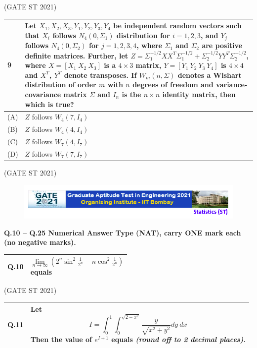 \documentclass[journal,12pt,onecolumn]{IEEEtran}
\theoremstyle{remark}
\begin{document}
\bigskip
\hfill (GATE ST 2021)
\\

\begin{tabular}{|p{1cm}|p{12.5cm}|}
\hline
\textbf{}9 & 
Let $X_1, X_2, X_3, Y_1, Y_2, Y_3, Y_4$ be independent random vectors such that $X_i$ follows $N_4(0, \Sigma_1)$ distribution for $i=1,2,3$, and $Y_j$ follows $N_4(0, \Sigma_2)$ for $j=1,2,3,4$, where $\Sigma_1$ and $\Sigma_2$ are positive definite matrices. Further, let
$Z = \Sigma_1^{-1/2} X X^T \Sigma_1^{-1/2} + \Sigma_2^{-1/2} Y Y^T \Sigma_2^{-1/2}$,
where $X = [X_1\ X_2\ X_3]$ is a $4\times3$ matrix, $Y = [Y_1\ Y_2\ Y_3\ Y_4]$ is $4\times4$ and $X^T$, $Y^T$ denote transposes.
If $W_m(n,\Sigma)$ denotes a Wishart distribution of order $m$ with $n$ degrees of freedom and variance-covariance matrix $\Sigma$ and $I_n$ is the $n\times n$ identity matrix, then which is true? \\
\hline
(A) & $Z$ follows $W_4(7, I_4)$ \\
\hline
(B) & $Z$ follows $W_4(4, I_4)$ \\
\hline
(C) & $Z$ follows $W_7(4, I_7)$ \\
\hline
(D) & $Z$ follows $W_7(7, I_7)$ \\
\hline
\end{tabular}

\bigskip
\hfill (GATE ST 2021)
\\
\newpage

\begin{figure}
\huge\centering
    \includegraphics[width=1\linewidth]{figs/0.png}
\end{figure}
\textbf{Q.10 -- Q.25 Numerical Answer Type (NAT), carry ONE mark each (no negative marks).}

\bigskip

\begin{tabular}{|p{1cm}|p{14cm}|}
\hline
\textbf{Q.10} &
$$
\lim_{n \to \infty} (2^n \sin^2 \tfrac{1}{2^n} - n \cos^2 \tfrac{1}{2^n}) $$
equals \\
\hline
\end{tabular}

\bigskip
\hfill (GATE ST 2021)
\\

\begin{tabular}{|p{1cm}|p{14cm}|}
\hline
\textbf{Q.11} &
Let 
$$
I = \int_0^1 \int_0^{\sqrt{2 - x^2}} \frac{y}{\sqrt{x^2 + y^2}} dy\ dx
$$
Then the value of $e^{I+1}$ equals \textit{(round off to 2 decimal places).} \\
\hline
\end{tabular}
\end{document}
